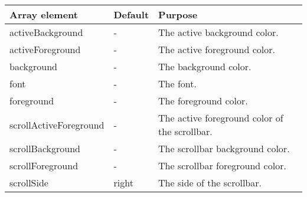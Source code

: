{\newpage
\clearpage
\samepage \begin{tabular}{|l|l|p{5.5cm}|} \hline
Array element          & Default & Purpose\\  \hline
activeBackground       & -       & The active background
                                   color.\\  \hline
activeForeground       & -       & The active foreground
                                   color.\\  \hline
background             & -       & The background color.\\  \hline
font                   & -       & The font.\\  \hline
foreground             & -       & The foreground color.\\  \hline
scrollActiveForeground & -       & The active foreground
                                   color of the scrollbar.\\  \hline 
scrollBackground       & -       & The scrollbar background
                                   color.\\  \hline
scrollForeground       & -       & The scrollbar foreground
                                   color.\\  \hline
scrollSide             & right   & The side of the scrollbar.\\  \hline
\end{tabular}
}

{\newpage
\clearpage
\samepage \begin{figure}[ht]
  \centerline{
  \epsfysize=6.3cm
  }
  
  \label{fig:CursorBox}
\end{figure}
}

